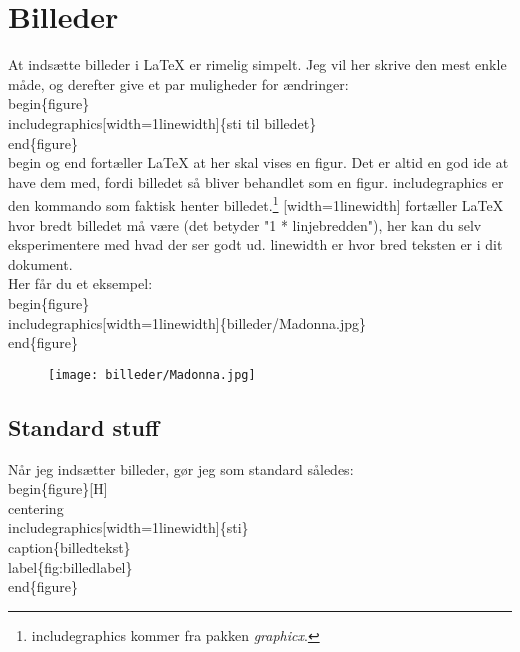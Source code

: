 \chapter{Billeder}

At indsætte billeder i LaTeX er rimelig simpelt. Jeg vil her skrive den mest enkle måde, og derefter give et par muligheder for ændringer:\\

\indent \bs begin\{figure\}\\
\indent \bs includegraphics[width=1\bs linewidth]\{sti til billedet\}\\
\indent \bs end\{figure\}\\

\noindent
\bs begin og \bs end fortæller LaTeX at her skal vises en figur. Det er altid en god ide at have dem med, fordi billedet så bliver behandlet som en figur. \bs includegraphics er den kommando som faktisk henter billedet.\footnote{\bs includegraphics kommer fra pakken \emph{graphicx}.} [width=1\bs linewidth] fortæller LaTeX hvor bredt billedet må være (det betyder "1 * linjebredden"), her kan du selv eksperimentere med hvad der ser godt ud. \bs linewidth er hvor bred teksten er i dit dokument.\\
\noindent Her får du et eksempel:\\

\indent \bs begin\{figure\}\\
\indent \bs includegraphics[width=1\bs linewidth]\{billeder/Madonna.jpg\}\\
\indent \bs end\{figure\}\\

\begin{figure}[H]
\texttt{[image: billeder/Madonna.jpg]}
\end{figure}

\section{Standard stuff}

Når jeg indsætter billeder, gør jeg som standard således:\\

\indent \bs begin\{figure\}[H]\\
\indent \bs centering\\
\indent \bs includegraphics[width=1\bs linewidth]\{sti\}\\
\indent \bs caption\{billedtekst\}\\
\indent \bs label\{fig:billedlabel\}\\
\indent \bs end\{figure\}\\

